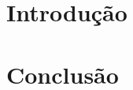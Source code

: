 \documentclass[12pt]{article}
\title{}
\author{Eduardo Verissimo Faccio, Guilherme Ferreira Lourenço}
\begin{document}
\maketitle

\begin{resumo}

\end{resumo}

\section{Introdução}

\section{Conclusão}




\nocite{*}
\end{document}
